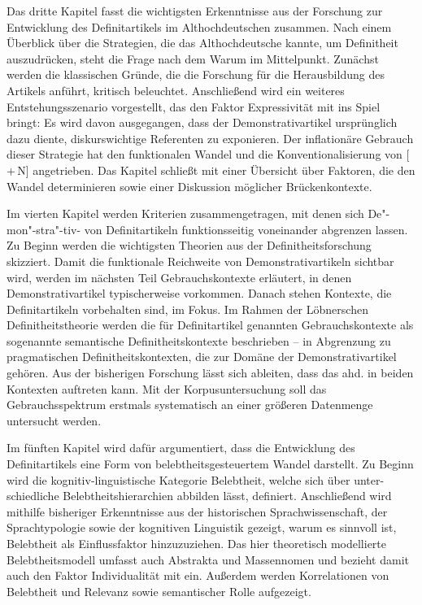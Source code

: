 Das dritte Kapitel fasst die wichtigsten Erkenntnisse aus der Forschung zur Entwicklung des Definitartikels im Althochdeutschen zusammen. Nach einem Überblick über die Strategien, die das Althochdeutsche kannte, um Definitheit auszudrücken, steht die Frage nach dem Warum im Mittelpunkt. Zunächst werden die klassischen Gründe, die die Forschung für die Herausbildung des Artikels anführt, kritisch beleuchtet. Anschließend wird ein weiteres Entstehungsszenario vorgestellt, das den Faktor Expressivität mit ins Spiel bringt: Es wird davon ausgegangen, dass der Demonstrativartikel ursprünglich dazu diente, diskurswichtige Referenten zu exponieren. Der inflationäre Gebrauch dieser Strategie hat den funktionalen Wandel und die Konventionalisierung von [\,+\,N] angetrieben. Das Kapitel schließt mit einer Übersicht über Faktoren, die den Wandel determinieren sowie einer Diskussion möglicher Brückenkontexte. 

Im vierten Kapitel werden Kriterien zusammengetragen, mit denen sich De"-mon"-stra"-tiv- von Definitartikeln funktionsseitig voneinander abgrenzen lassen. Zu Beginn werden die wichtigsten Theorien aus der Definitheitsforschung  skizziert. Damit die funktionale Reichweite von Demonstrativartikeln sichtbar wird, werden im nächsten Teil Gebrauchskontexte erläutert, in denen Demonstrativartikel typischerweise vorkommen. Danach stehen Kontexte, die  Definitartikeln vorbehalten sind, im Fokus. 
Im Rahmen der Löbnerschen Definitheitstheorie \parencite{Lobner1985}  werden die für Definitartikel genannten Gebrauchskontexte als sogenannte semantische Definitheitskontexte beschrieben -- in Abgrenzung zu  pragmatischen Definitheitskontexten, die zur Domäne der Demonstrativartikel gehören. Aus der bisherigen Forschung lässt sich ableiten, dass das ahd.  in beiden Kontexten auftreten kann. Mit der Korpusuntersuchung soll das Gebrauchsspektrum erstmals systematisch an einer größeren Datenmenge untersucht werden. 

Im fünften Kapitel wird dafür argumentiert, dass die Entwicklung des Definitartikels eine Form von belebtheitsgesteuertem Wandel darstellt. Zu Beginn wird die kognitiv-linguistische Kategorie Belebtheit, welche sich über unter-\linebreak schiedliche Belebtheitshierarchien abbilden lässt, definiert. Anschließend wird mithilfe bisheriger Erkenntnisse aus der historischen Sprachwissenschaft, der Sprachtypologie sowie der kognitiven Linguistik gezeigt, warum es sinnvoll ist, Belebtheit als Einflussfaktor hinzuzuziehen. Das hier theoretisch modellierte Belebtheitsmodell umfasst auch Abstrakta und Massennomen und bezieht damit auch den Faktor Individualität mit ein. Außerdem werden Korrelationen von Belebtheit und Relevanz sowie semantischer Rolle aufgezeigt.

